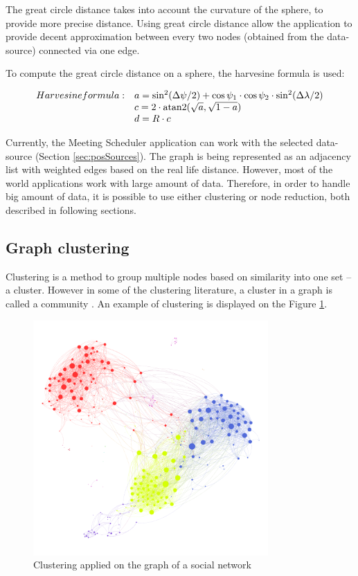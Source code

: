 \documentclass[thesis=M,english]{FITthesis}[2012/10/20]
\DeclareMathOperator{\atantwo}{atan2}
\begin{document}
The great circle distance takes into account the curvature of the sphere, to provide more precise distance. Using great circle distance allow the application to provide decent approximation between every two nodes (obtained from the data-source) connected via one edge.

To compute the great circle distance on a sphere, the harvesine formula is used: 

$$
\begin{array}{l l}
Harvesine formula: & a = \sin^2(\Delta \psi /2) + \cos \psi_1 \cdot \cos \psi_2 \cdot \sin^2(\Delta \lambda /2) \\
& c = 2 \cdot \atantwo ( \sqrt{a}, \sqrt{1 - a} ) \\
& d = R \cdot c
\end{array}
$$ 

Currently, the Meeting Scheduler application can work with the selected data-source (Section \ref{sec:posSources}). The graph is being represented as an adjacency list with weighted edges based on the real life distance. However, most of the world applications work with large amount of data. Therefore, in order to handle big amount of data, it is possible to use either clustering or node reduction, both described in following sections.

\subsection{Graph clustering}
\label{sec:Clustering}
Clustering is a method to group multiple nodes based on similarity into one set -- a cluster. However in some of the clustering literature, a cluster in a graph is called a community \cite{Newman04}. An example of clustering is displayed on the Figure \ref{pic:Clustering}.


\begin{figure}[h]
\centering
\includegraphics[width=0.8\textwidth]{pics/clustering}
\caption{Clustering applied on the graph of a social network \cite{Griffen17}}
\label{pic:Clustering}
\end{figure}
\end{document}
